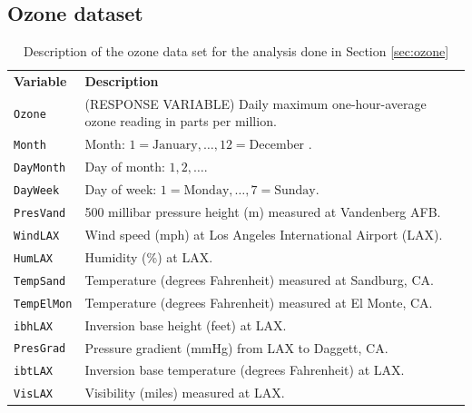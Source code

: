 \subsection{Ozone dataset}
\label{apx:ozone}

\begin{table}[H]
\centering
\begin{tabular}{p{2.1cm}p{11.5cm}}
\textbf{Variable}     & \textbf{Description} \\
\texttt{Ozone}      & (RESPONSE VARIABLE) Daily maximum one-hour-average ozone reading in parts per million. \\
\texttt{Month}     & Month: $1 = \text{January}, \dots, 12 = \text{December}$ .                                      \\
\texttt{DayMonth}  & Day of month: $1,2,\dots$.                                                                 \\
\texttt{DayWeek}   & Day of week: $1 = \text{Monday}, \dots, 7 = \text{Sunday}$.                                    \\
\texttt{PresVand}  & 500 millibar pressure height (m) measured at Vandenberg AFB.                  \\
\texttt{WindLAX}   & Wind speed (mph) at Los Angeles International Airport (LAX).                  \\
\texttt{HumLAX}    & Humidity (\%) at LAX.                                                         \\
\texttt{TempSand}  & Temperature (degrees Fahrenheit) measured at Sandburg, CA.                             \\
\texttt{TempElMon} & Temperature (degrees Fahrenheit) measured at El Monte, CA.                             \\
\texttt{ibhLAX}   & Inversion base height (feet) at LAX.                                          \\
\texttt{PresGrad}  & Pressure gradient (mmHg) from LAX to Daggett, CA.                            \\
\texttt{ibtLAX}    & Inversion base temperature (degrees Fahrenheit) at LAX.                               \\
\texttt{VisLAX}    & Visibility (miles) measured at LAX.                                          
\end{tabular}
\caption{Description of the ozone data set for the analysis done in Section \ref{sec:ozone}}
\label{tab:ozone}
\end{table}

